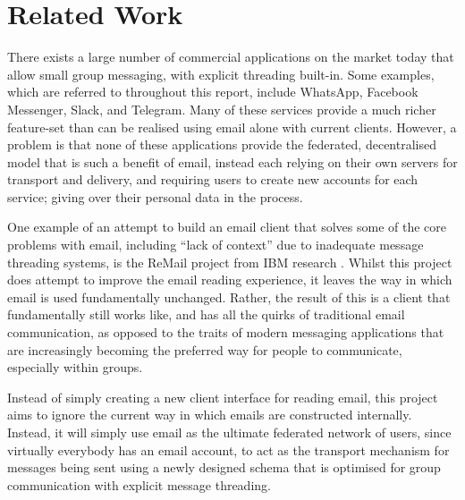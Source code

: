 \chapter{Related Work}


There exists a large number of commercial applications on the market today that allow small group messaging, with explicit threading built-in. Some examples, which are referred to throughout this report, include WhatsApp, Facebook Messenger, Slack, and Telegram. Many of these services provide a much richer feature-set than can be realised using email alone with current clients. However, a problem is that none of these applications provide the federated, decentralised model that is such a benefit of email, instead each relying on their own servers for transport and delivery, and requiring users to create new accounts for each service; giving over their personal data in the process.

One example of an attempt to build an email client that solves some of the core problems with email, including ``lack of context'' due to inadequate message threading systems, is the ReMail project from IBM research \cite{kerr2004designing}. Whilst this project does attempt to improve the email reading experience, it leaves the way in which email is used fundamentally unchanged. Rather, the result of this is a client that fundamentally still works like, and has all the quirks of traditional email communication, as opposed to the traits of modern messaging applications that are increasingly becoming the preferred way for people to communicate, especially within groups.

Instead of simply creating a new client interface for reading email, this project aims to ignore the current way in which emails are constructed internally. Instead, it will simply use email as the ultimate federated network of users, since virtually everybody has an email account, to act as the transport mechanism for messages being sent using a newly designed schema that is optimised for group communication with explicit message threading.
